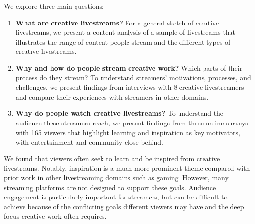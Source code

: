 


We explore three main questions: 
\begin{enumerate}
    \item \textbf{What are creative livestreams?} For a general sketch of creative livestreams, we present a content analysis of a sample of livestreams that illustrates the range of content people stream and the different types of creative livestreams.
    \item \textbf{Why and how do people stream creative work?} Which parts of their process do they stream? To understand streamers' motivations, processes, and challenges, we present findings from interviews with 8 creative livestreamers and compare their experiences with streamers in other domains.
    \item \textbf{Why do people watch creative livestreams?} To understand the audience these streamers reach, we present findings from three online surveys with 165 viewers that highlight learning and inspiration as key motivators, with entertainment and community close behind.
\end{enumerate}

We found that viewers often seek to learn and be inspired from creative livestreams. Notably, inspiration is a much more prominent theme compared with prior work in other livestreaming domains such as gaming. However, many streaming platforms are not designed to support these goals. Audience engagement is particularly important for streamers, but can be difficult to achieve because of the conflicting goals different viewers may have and the deep focus creative work often requires.
